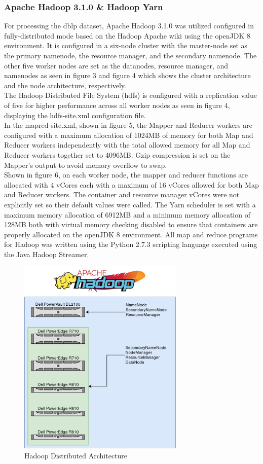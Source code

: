\documentclass[10pt,journal,compsoc]{IEEEtran}
\begin{document}
\subsubsection{Apache Hadoop 3.1.0 \& Hadoop Yarn}
\indent For processing the dblp dataset, Apache Hadoop 3.1.0 was utilized configured in fully-distributed mode based on the Hadoop Apache wiki \cite{HadoopClusterWiki} using the openJDK 8 environment. It is configured in a six-node cluster with the master-node set as the primary namenode, the resource manager, and the secondary namenode. The other five worker nodes are set as the datanodes, resource manager, and namenodes as seen in figure 3 and figure 4 which shows the cluster architecture and the node architecture, respectively. \\
\indent The Hadoop Distributed File System (hdfs) is configured with a replication value of five for higher performance across all worker nodes as seen in figure 4, displaying the hdfs-site.xml configuration file. \\
\indent In the mapred-site.xml, shown in figure 5, the Mapper and Reducer workers are configured with a maximum allocation of 1024MB of memory for both Map and Reducer workers independently with the total allowed memory for all Map and Reducer workers together set to 4096MB. Gzip compression is set on the Mapper’s output to avoid memory overflow to swap. \\
\indent Shown in figure 6, on each worker node, the mapper and reducer functions are allocated with 4 vCores each with a maximum of 16 vCores allowed for both Map and Reducer workers. The container and resource manager vCores were not explicitly set so their default values were called. The Yarn scheduler is set with a maximum memory allocation of 6912MB and a minimum memory allocation of 128MB both with virtual memory checking disabled to ensure that containers are properly allocated on the openJDK 8 environment.  All map and reduce programs for Hadoop was written using the Python 2.7.3 scripting language executed using the Java Hadoop Streamer. 

\begin{figure}[htp]
\centering
\includegraphics[width=7.9cm]{Images/Neuro_Hadoop_Architecture.png}
\caption{Hadoop Distributed Architecture}
\label{fig:Hadoop Architecture}
\end{figure}
\end{document}
